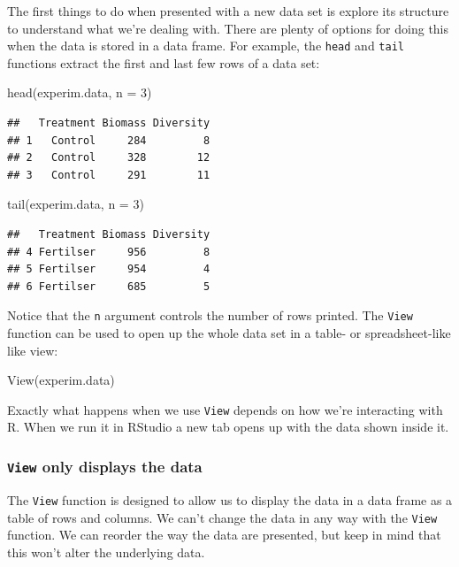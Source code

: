 \documentclass[
]{book}
\newenvironment{Shaded}{\begin{snugshade}}{\end{snugshade}}
\newcommand{\AttributeTok}[1]{\textcolor[rgb]{0.77,0.63,0.00}{#1}}
\newcommand{\DecValTok}[1]{\textcolor[rgb]{0.00,0.00,0.81}{#1}}
\newcommand{\FunctionTok}[1]{\textcolor[rgb]{0.00,0.00,0.00}{#1}}
\newcommand{\NormalTok}[1]{#1}
\newenvironment{greybox}{
  \definecolor{shadecolor}{rgb}{0.95,0.95,0.95}  %
  \color{black}
  \begin{shaded}}
 {\end{shaded}}
\newenvironment{infobox}[1]
  {
  \begin{itemize}
  \renewcommand{\labelitemi}{
    \raisebox{-.7\height}[0pt][0pt]{
      {\setkeys{Gin}{width=3em,keepaspectratio}
        \texttt{[image: images/\#1]}}
    }
  }
  \setlength{\fboxsep}{1em}
  \begin{greybox}
  \item
  }
  {
  \end{greybox}
  \end{itemize}
  }
\begin{document}
The first things to do when presented with a new data set is explore its structure to understand what we're dealing with. There are plenty of options for doing this when the data is stored in a data frame. For example, the \texttt{head} and \texttt{tail} functions extract the first and last few rows of a data set:

\begin{Shaded}
\begin{Highlighting}[]
\FunctionTok{head}\NormalTok{(experim.data, }\AttributeTok{n =} \DecValTok{3}\NormalTok{)}
\end{Highlighting}
\end{Shaded}

\begin{verbatim}
##   Treatment Biomass Diversity
## 1   Control     284         8
## 2   Control     328        12
## 3   Control     291        11
\end{verbatim}

\begin{Shaded}
\begin{Highlighting}[]
\FunctionTok{tail}\NormalTok{(experim.data, }\AttributeTok{n =} \DecValTok{3}\NormalTok{)}
\end{Highlighting}
\end{Shaded}

\begin{verbatim}
##   Treatment Biomass Diversity
## 4 Fertilser     956         8
## 5 Fertilser     954         4
## 6 Fertilser     685         5
\end{verbatim}

Notice that the \texttt{n} argument controls the number of rows printed. The \texttt{View} function can be used to open up the whole data set in a table- or spreadsheet-like like view:

\begin{Shaded}
\begin{Highlighting}[]
\FunctionTok{View}\NormalTok{(experim.data)}
\end{Highlighting}
\end{Shaded}

Exactly what happens when we use \texttt{View} depends on how we're interacting with R. When we run it in RStudio a new tab opens up with the data shown inside it.

\begin{infobox}{warning}

\hypertarget{view-only-displays-the-data}{%
\subsubsection*{\texorpdfstring{\texttt{View} only displays the data}{View only displays the data}}\label{view-only-displays-the-data}}

The \texttt{View} function is designed to allow us to display the data in a data frame as a table of rows and columns. We can't change the data in any way with the \texttt{View} function. We can reorder the way the data are presented, but keep in mind that this won't alter the underlying data.

\end{infobox}
\end{document}
